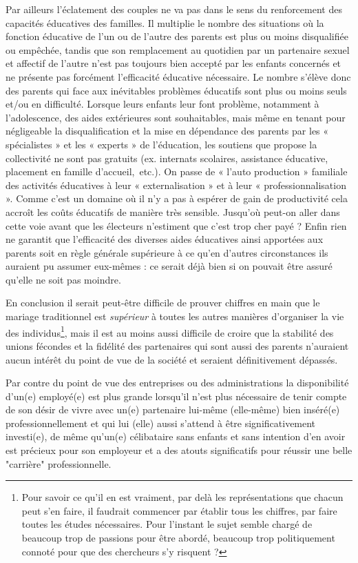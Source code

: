 Par ailleurs l'éclatement des couples ne va pas dans le sens du renforcement des capacités éducatives des familles. Il multiplie le nombre des situations où la fonction éducative de l'un ou de l'autre des parents est plus ou moins disqualifiée ou empêchée, tandis que son remplacement au quotidien par un partenaire sexuel et affectif de l'autre n'est pas toujours bien accepté par les enfants concernés et ne présente pas forcément l'efficacité éducative nécessaire. Le nombre s'élève donc des parents qui face aux inévitables problèmes éducatifs sont plus ou moins seuls et/ou en difficulté. Lorsque leurs enfants leur font problème, notamment à l'adolescence, des aides extérieures sont souhaitables, mais même en tenant pour négligeable la disqualification et la mise en dépendance des parents par les « spécialistes » et les « experts » de l'éducation, les soutiens que propose la collectivité ne sont pas gratuits (ex. internats scolaires, assistance éducative, placement en famille d'accueil,~etc.). On passe de « l'auto production » familiale des activités éducatives à leur « externalisation » et à leur « professionnalisation ». Comme c'est un domaine où il n'y a pas à espérer de gain de productivité cela accroît les coûts éducatifs de manière très sensible. Jusqu'où peut-on aller dans cette voie avant que les électeurs n'estiment que c'est trop cher payé ? Enfin rien ne garantit que l'efficacité des diverses aides éducatives ainsi apportées aux parents soit en règle générale supérieure à ce qu'en d'autres circonstances ils auraient pu assumer eux-mêmes : ce serait déjà bien si on pouvait être assuré qu'elle ne soit pas moindre. 

En conclusion il serait peut-être difficile de prouver chiffres en main que le mariage traditionnel est \emph{supérieur} à toutes les autres manières d'organiser la vie des individus\footnote{Pour savoir ce qu'il en est vraiment, par delà les représentations que chacun peut s'en faire, il faudrait commencer par établir tous les chiffres, par faire toutes les études nécessaires. Pour l'instant le sujet semble chargé de beaucoup trop de passions pour être abordé, beaucoup trop politiquement connoté pour que des chercheurs s'y risquent ?}, mais il est au moins aussi difficile de croire que la stabilité des unions fécondes et la fidélité des partenaires qui sont aussi des parents n'auraient aucun intérêt du point de vue de la société et seraient définitivement dépassés. 

Par contre du point de vue des entreprises ou des administrations la disponibilité d'un(e) employé(e) est plus grande lorsqu'il n'est plus nécessaire de tenir compte de son désir de vivre avec un(e) partenaire lui-même (elle-même) bien inséré(e) professionnellement et qui lui (elle) aussi s'attend à être significativement investi(e), de même qu'un(e) célibataire sans enfants et sans intention d'en avoir est précieux pour son employeur et a des atouts significatifs pour réussir une belle "carrière" professionnelle.

